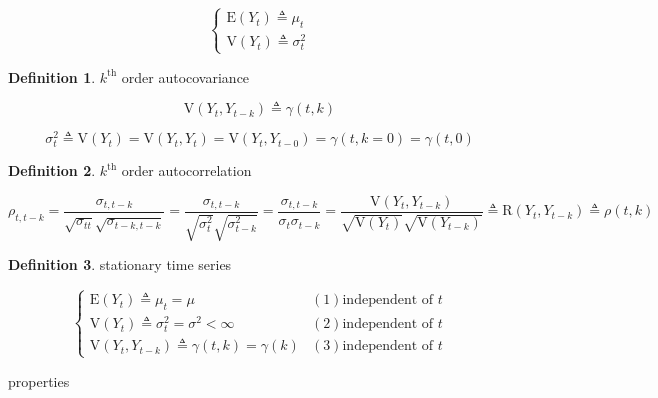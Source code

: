 \documentclass[
]{book}
\theoremstyle{definition}
\newtheorem{definition}{Definition}[chapter]
\theoremstyle{definition}
\theoremstyle{definition}
\theoremstyle{definition}
\theoremstyle{remark}
\begin{document}
\[
\begin{cases}
\mathrm{E}\left(Y_{t}\right)\triangleq\mu_{t}\\
\mathrm{V}\left(Y_{t}\right)\triangleq\sigma_{t}^{2}
\end{cases}
\]

\begin{definition}
\protect\hypertarget{def:unnamed-chunk-2}{}\label{def:unnamed-chunk-2}\(k^\text{th}\) order autocovariance
\end{definition}

\[
\mathrm{V}\left(Y_{t},Y_{t-k}\right)\triangleq\gamma\left(t,k\right)
\]

\[
\sigma_{t}^{2}\triangleq\mathrm{V}\left(Y_{t}\right)=\mathrm{V}\left(Y_{t},Y_{t}\right)=\mathrm{V}\left(Y_{t},Y_{t-0}\right)=\gamma\left(t,k=0\right)=\gamma\left(t,0\right)
\]

\begin{definition}
\protect\hypertarget{def:unnamed-chunk-3}{}\label{def:unnamed-chunk-3}\(k^\text{th}\) order autocorrelation
\end{definition}

\[
\rho_{t,t-k}=\dfrac{\sigma_{t,t-k}}{\sqrt{\sigma_{tt}}\sqrt{\sigma_{t-k,t-k}}}=\dfrac{\sigma_{t,t-k}}{\sqrt{\sigma_{t}^{2}}\sqrt{\sigma_{t-k}^{2}}}=\dfrac{\sigma_{t,t-k}}{\sigma_{t}\sigma_{t-k}}=\dfrac{\mathrm{V}\left(Y_{t},Y_{t-k}\right)}{\sqrt{\mathrm{V}\left(Y_{t}\right)}\sqrt{\mathrm{V}\left(Y_{t-k}\right)}}\triangleq\mathrm{R}\left(Y_{t},Y_{t-k}\right)\triangleq\rho\left(t,k\right)
\]

\begin{definition}
\protect\hypertarget{def:unnamed-chunk-4}{}\label{def:unnamed-chunk-4}stationary time series
\end{definition}

\[
\begin{cases}
\mathrm{E}\left(Y_{t}\right)\triangleq\mu_{t}=\mu & \left(1\right)\text{independent of }t\\
\mathrm{V}\left(Y_{t}\right)\triangleq\sigma_{t}^{2}=\sigma^{2}<\infty & \left(2\right)\text{independent of }t\\
\mathrm{V}\left(Y_{t},Y_{t-k}\right)\triangleq\gamma\left(t,k\right)=\gamma\left(k\right) & \left(3\right)\text{independent of }t
\end{cases}
\]

properties
\end{document}
